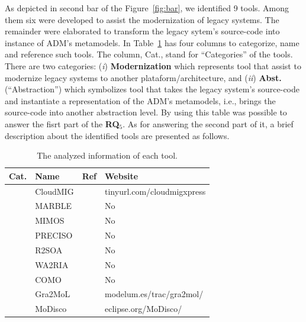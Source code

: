 As depicted in second bar of the Figure~\ref{fig:bar}, we identified 9 tools. Among them six were developed to assist the modernization of legacy systems. The remainder were elaborated to transform the legacy sytem's source-code into instance of ADM's metamodels. In Table~\ref{tab:tools} has four columns to categorize, name and reference such tools. The column, Cat., stand for ``Categories'' of the tools. There are two categories: (\textit{i}) \textbf{Modernization} which represents tool that assist to modernize legacy systems to another plataform/architecture, and (\textit{ii}) \textbf{Abst.} (``Abstraction'') which symbolizes tool that takes the legacy system's source-code and instantiate a representation of the ADM's metamodels, i.e., brings the source-code into another abstraction level. By using this table was possible to  answer the fisrt part of the \textbf{RQ$_5$}. As for answering the second part of it, a brief description about the identified tools are presented as follows. 

\begin{table}
\scriptsize
\centering
\caption{The analyzed information of each tool.}
  \begin{tabular}{|>{\centering}p{0.6cm}|l|l|l|}
\hline 
 \cellcolor{gray} Cat. & \cellcolor{gray}Name & \cellcolor{gray}Ref & \cellcolor{gray}Website\tabularnewline
\hline 
\hline
\multirow{6}{*}{\begin{sideways} 
Modernize
\end{sideways}} &
CloudMIG &\cite{SMR:SMR582}  & tinyurl.com/cloudmigxpress\tabularnewline
\cline{2-4}  
& MARBLE &\cite{Perez-Castillo:2011:ECS:1982185.1982249,6080834, 6498507,Perez-Castillo:2010:IBP:1875847.1875861}  & No\tabularnewline
\cline{2-4} 
& MIMOS &~\cite{6498507} & No\tabularnewline
\cline{2-4} 
& PRECISO &~\cite{delCastillo:2009:PRP:1529282.1529753}  & No\tabularnewline
\cline{2-4} 
& R2SOA &~\cite{Guzman:2007:AAR:1339262.1339532} & No\tabularnewline
\cline{2-4} 
& WA2RIA &~\cite{Rodriguez-Echeverria:2011:MLW:2186508.2186536}  & No\tabularnewline
\hline
\multirow{3}{*}{\begin{sideways} 
Abst.
\end{sideways}} 
& COMO &\cite{5773392}  & No\tabularnewline
\cline{2-4}  
& Gra2MoL &\cite{5440163}  & modelum.es/trac/gra2mol/\tabularnewline
\cline{2-4}  
& MoDisco &~\cite{Bruneliere:2010:MGE:1858996.1859032} & eclipse.org/MoDisco/\tabularnewline
\hline 
\end{tabular}
\label{tab:tools}
\end{table}

